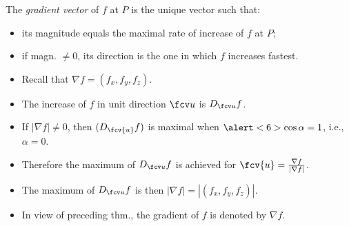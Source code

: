 \begin{frame}
\begin{definition}
The \emph{gradient vector} of $f$ at $P$ is the unique vector such that:
\begin{itemize}
\item its magnitude equals  the maximal rate of increase of $f$ at $P$;
\item if magn. $\neq 0$, its \alert<2>{direction is the one in which $f$ increases fastest}.
\end{itemize}
\end{definition}
\begin{itemize}
\item<3-> Recall that $\nabla f=( f_x, f_y, f_z)$.
\item<2-> \alert<2>{ The increase of $f$} in \alert<5>{unit direction $\fcv u$} \alert<2>{is $D_{\fcv u} f $}. 
\item<6-> If $|\nabla f| \neq 0$, then $(D_{\fcv{u}}f)$ is maximal when $\alert<6>{\cos \alpha=1}$, i.e., $\alpha = 0$.
\item<7-> Therefore the maximum of $D_{\fcv u}f$ is achieved for $\fcv{u} =\frac{\nabla f}{|\nabla f|}$.
\item<8-> The maximum of $D_{\fcv u}f$ is then $|\nabla f| = |( f_x, f_y , f_z)|$.
\item<10-> In view of preceding thm., the gradient of $f$ is denoted by $\nabla f$.
\end{itemize}
\end{frame}
